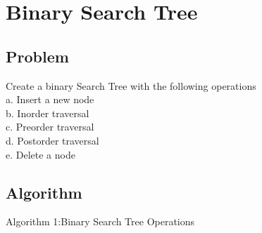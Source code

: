 \documentclass[14pt, letterpaper]{article}
\begin{document}
\section{Binary Search Tree}

\subsection{Problem}
Create a binary Search Tree with the following operations\\
a. Insert a new node\\
b. Inorder traversal\\
c. Preorder traversal\\
d. Postorder traversal\\
e. Delete a node
\subsection{Algorithm}
\hline 
\vspace{0.1cm}
\hspace{0.2 cm}Algorithm 1:Binary Search Tree Operations
\vspace{0.1cm}
\hline
\end{document}
